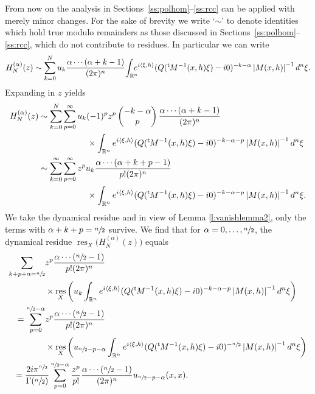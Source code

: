 \documentclass[JEP,XML,SOM,Unicode]{cedram}
\theoremstyle{definition}
\let\cv\alpha
\let\euler X
\DeclareMathOperator{\resnorm}{res}
\newcommand{\resdyn}{{\resnorm_\euler}}
\newcommand{\module}[1]{\left|#1\right|}
\newcommand{\secs}[2]{Sections~\ref{#1}--\ref{#2}}
\def\sn2{\sfrac{n}{2}}
\renewcommand{\t}{{{}^{\mathrm{t}\mkern-2mu}}}
\begin{document}
From now on the analysis in \secs{ss:polhom}{ss:rcc} can be applied with merely minor changes. For the sake of brevity we write `$\sim$' to denote identities which hold true modulo remainders as those discussed in \secs{ss:polhom}{ss:rcc}, which do not contribute to residues. In particular we can write
\[
H_N^{(\cv)}(z) \sim \sum_{k=0}^N u_k \frac{\cv\cdots(\cv+k-1)}{(2\pi)^n} \!\int_{\mathbb{R}^n}\hspace*{-2.5mm} e^{i\left\langle\xi,h \right\rangle}
(Q(\t M^{-1}(x,h)\xi)-i0)^{-k-\cv} \module{M(x,h)}^{-1} d^n\xi.
\]
Expanding in $z$ yields
\[
\begin{aligned}
H_N^{(\cv)}(z)&\sim \sum_{k=0}^N\sum_{p=0}^\infty u_k (-1)^pz^p \begin{pmatrix}
-k-\cv
\\
p
\end{pmatrix} \frac{\cv\cdots(\cv+k-1)}{(2\pi)^n}\\
&\hspace*{2cm} \times \int_{\mathbb{R}^n} e^{i\left\langle\xi,h \right\rangle}
(Q(\t M^{-1}(x,h)\xi)-i0)^{-k-\cv-p} \module{M(x,h)}^{-1} d^n\xi
\\ & \sim \sum_{k=0}^\infty \sum_{p=0}^\infty z^p u_k \frac{\cv\cdots(\cv+k+p-1)}{p!(2\pi)^n}\\
&\hspace*{2cm} \times\int_{\mathbb{R}^n} e^{i\left\langle\xi,h \right\rangle}
(Q(\t M^{-1}(x,h)\xi)-i0)^{-k-\cv-p} \module{M(x,h)}^{-1} d^n\xi.
\end{aligned}
\]
We take the dynamical residue and in view of Lemma \ref{l:vanishlemma2}, only the
terms with $\cv+k+p=\sfrac{n}{2}$ survive. We find that for $\cv=0,\dots,\sn2$, the dynamical residue $\resdyn\big(H_N^{(\cv)}(z)\big)$ equals
\[
\begin{aligned}
\sum_{k+p+\cv=\sfrac{n}{2}}
&z^p \frac{\cv\cdots(\sfrac{n}{2}-1)}{p!(2\pi)^n}\\
&\times\resdyn\left(u_k\int_{\mathbb{R}^n} e^{i\left\langle\xi,h \right\rangle}
(Q(\t M^{-1}(x,h)\xi)-i0)^{-k-\cv-p} \module{M(x,h)}^{-1} d^n\xi\right)
\\
=\sum_{p=0}^{\sfrac{n}{2}-\cv}
&z^p \frac{\cv\cdots(\sfrac{n}{2}-1)}{p!(2\pi)^n}\\
&\times\resdyn\left(u_{\sfrac{n}{2}-p-\cv}\int_{\mathbb{R}^n} e^{i\left\langle\xi,h \right\rangle}
(Q(\t M^{-1}(x,h)\xi)-i0)^{-\sfrac{n}{2}} \module{M(x,h)}^{-1} d^n\xi\right)\\
&\hspace*{-1.3cm}=\frac{2i\pi^{\sfrac{n}{2}}}{\Gamma(\sfrac{n}{2})}\sum_{p=0}^{\sfrac{n}{2}-\cv}
\frac{z^p}{p!} \frac{\cv\cdots(\sfrac{n}{2}-1)}{(2\pi)^n}u_{\sfrac{n}{2}-p-\cv}(x,x).
\end{aligned}
\]
\end{document}
